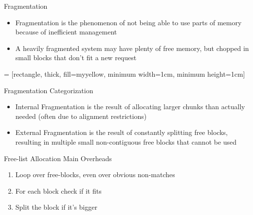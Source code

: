 \documentclass[
14pt,
aspectratio=169,
usenames,
dvipsnames,
x11names]{beamer}
\begin{document}
\begin{frame}{Fragmentation}
  \begin{itemize}  \setlength{\itemsep}{\fill}
  \item Fragmentation is the phenomenon of \alert{not being able to use parts of memory} because of inefficient management
  \item A \alert{heavily fragmented} system may have \alert{plenty of free memory}, but chopped in small blocks that \alert{don't fit} a new request
  \end{itemize}

  \centering
   = [rectangle, thick, fill=myyellow, minimum width=1cm, minimum height=1cm]


\end{frame}

\begin{frame}{Fragmentation Categorization}
  \begin{itemize}  \setlength{\itemsep}{\fill}
  \item \alert{Internal Fragmentation} is the result of allocating larger chunks than actually needed (often due to alignment restrictions)
  \item \alert{External Fragmentation} is the result of constantly splitting free blocks, resulting in multiple small non-contiguous free blocks that cannot be used
  \end{itemize}
\end{frame}


\begin{frame}{Free-list Allocation Main Overheads}
  \begin{enumerate}  \setlength{\itemsep}{\fill}
  \item Loop over free-blocks, even over obvious non-matches
  \item For each block check if it fits
  \item Split the block if it's bigger
  \end{enumerate}
\end{frame}
\end{document}
